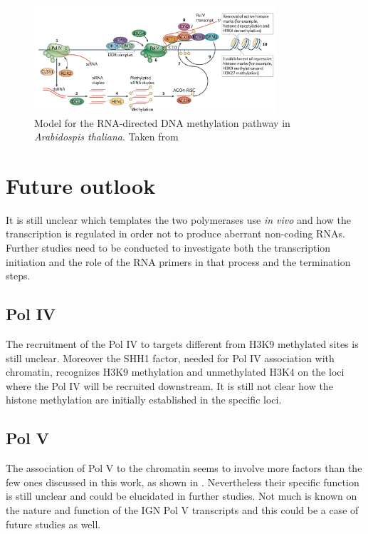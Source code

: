\documentclass[a4paper, twocolumn]{article}
\begin{document}
\begin{figure}
	\includegraphics[width=9cm]{complete_process.png}
	\caption{Model for the RNA-directed DNA methylation pathway in \textit{Arabidospis thaliana}. Taken from \cite{HAAG2011}}
	\label{fig:model}
\end{figure}

\section{Future outlook}
It is still unclear which templates the two polymerases use \textit{in vivo} and how the transcription is regulated in order not to produce aberrant non-coding RNAs. 
Further studies need to be conducted to investigate both the transcription initiation and the role of the RNA primers in that process and the termination steps. 

\subsection{Pol IV}
The recruitment of the Pol IV to targets different from H3K9 methylated sites is still unclear. Moreover the SHH1 factor, needed for Pol IV association with chromatin, recognizes H3K9 methylation and unmethylated H3K4 on the loci where the Pol IV will be recruited downstream. \cite{LAW2013} It is still not clear how the histone methylation are initially established in the specific loci.

\subsection{Pol V}
The association of Pol V to the chromatin seems to involve more factors than the few ones discussed in this work, as shown in \cite{STROUD2012}. Nevertheless  their specific function is still unclear and could be elucidated in further studies. 
Not much is known on the nature and function of the IGN Pol V transcripts and this could be a case of future studies as well. 



\end{document}
